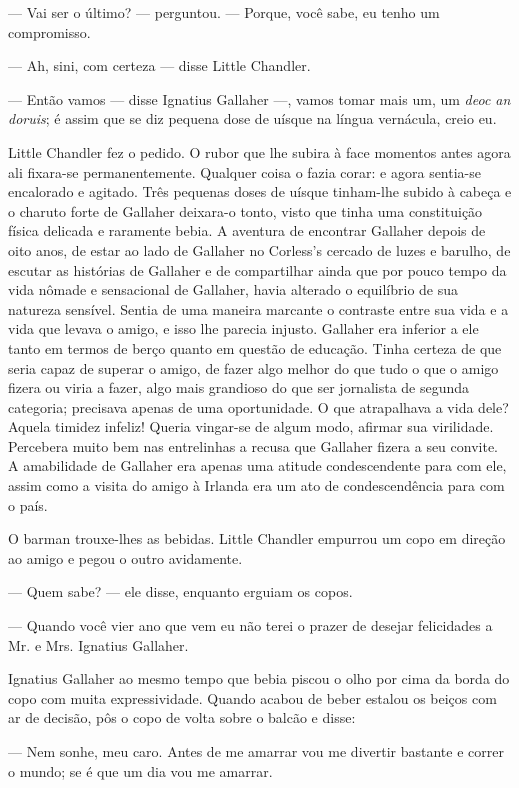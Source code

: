 --- Vai ser o último? --- perguntou. --- Porque, você sabe, eu tenho
um compromisso.

--- Ah, sini, com certeza --- disse Little Chandler.

--- Então vamos --- disse Ignatius Gallaher ---, vamos tomar mais um,
um \textit{deoc an doruis}; é assim que se diz pequena dose de uísque na língua
vernácula, creio eu.

Little Chandler fez o pedido. O rubor que lhe subira à face momentos
antes agora ali fixara-se permanentemente. Qualquer coisa o fazia
corar: e agora sentia-se encalorado e agitado. Três pequenas doses de
uísque tinham-lhe subido à cabeça e o charuto forte de Gallaher
deixara-o tonto, visto que tinha uma constituição física delicada e
raramente bebia. A aventura de encontrar Gallaher depois de oito anos,
de estar ao lado de Gallaher no Corless's
cercado de luzes e barulho, de escutar as histórias de Gallaher e de
compartilhar ainda que por pouco tempo da vida nômade e sensacional de
Gallaher, havia alterado o equilíbrio de sua natureza sensível.
Sentia de uma maneira marcante o contraste entre sua vida e a vida
que levava o amigo, e isso lhe parecia injusto. Gallaher era inferior
a ele tanto em termos de berço quanto em questão de educação. Tinha
certeza de que seria capaz de superar o amigo, de fazer algo melhor do
que tudo o que o amigo fizera ou viria a fazer, algo mais grandioso do
que ser jornalista de segunda categoria; precisava apenas de uma
oportunidade. O que atrapalhava a vida dele? Aquela timidez infeliz!
Queria vingar-se de algum modo, afirmar sua virilidade. Percebera
muito bem nas entrelinhas a recusa que Gallaher fizera a seu convite.
A amabilidade de Gallaher era apenas uma atitude condescendente para
com ele, assim como a visita do amigo à Irlanda era um ato de
condescendência para com o país.

O barman trouxe-lhes as bebidas. Little Chandler empurrou um copo em
direção ao amigo e pegou o outro avidamente.

--- Quem sabe? --- ele disse, enquanto erguiam os copos.

--- Quando você vier ano que vem eu não terei o prazer de desejar
felicidades a Mr. e Mrs. Ignatius Gallaher.

Ignatius Gallaher ao mesmo tempo que bebia piscou o olho por cima da
borda do copo com muita expressividade. Quando acabou de beber estalou
os beiços com ar de decisão, pôs o copo de volta sobre o balcão e
disse:

--- Nem sonhe, meu caro. Antes de me amarrar vou me divertir bastante e
correr o mundo; se é que um dia vou me amarrar.

